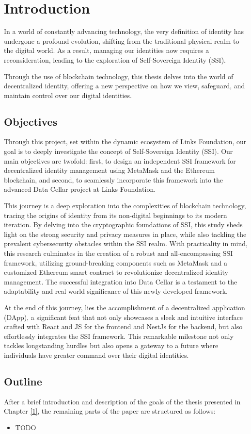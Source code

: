 \hypersetup{
    colorlinks=true,
    linkcolor=blue
}

\chapter{Introduction} \label{ch:introduction}

In a world of constantly advancing technology, the very definition of identity has undergone a 
profound evolution, shifting from the traditional physical realm to the digital world. As a 
result, managing our identities now requires a reconsideration, leading to the exploration of 
Self-Sovereign Identity (SSI). 

Through the use of blockchain technology, this thesis delves into the world of decentralized 
identity, offering a new perspective on how we view, safeguard, and maintain control over our 
digital identities.

\section{Objectives} 

Through this project, set within the dynamic ecosystem of Links Foundation, our goal is to deeply 
investigate the concept of Self-Sovereign Identity (SSI). Our main objectives are twofold: first, 
to design an independent SSI framework for decentralized identity management using MetaMask and 
the Ethereum blockchain, and second, to seamlessly incorporate this framework into the advanced 
Data Cellar project at Links Foundation.

This journey is a deep exploration into the complexities of blockchain technology, tracing the 
origins of identity from its non-digital beginnings to its modern iteration. By delving into the 
cryptographic foundations of SSI, this study sheds light on the strong security and privacy 
measures in place, while also tackling the prevalent cybersecurity obstacles within the SSI 
realm. With practicality in mind, this research culminates in the creation of a robust and 
all-encompassing SSI framework, utilizing ground-breaking components such as MetaMask and a 
customized Ethereum smart contract to revolutionize decentralized identity management. 
The successful integration into Data Cellar is a testament to the adaptability and real-world 
significance of this newly developed framework.

At the end of this journey, lies the accomplishment of a decentralized application (DApp), a 
significant feat that not only showcases a sleek and intuitive interface crafted with React and 
JS for the frontend and NestJs for the backend, but also effortlessly integrates the SSI 
framework. This remarkable milestone not only tackles longstanding hurdles but also opens a 
gateway to a future where individuals have greater command over their digital identities.

\section{Outline}

After a brief introduction and description of the goals of the thesis presented in Chapter 
\hyperref[ch:introduction]{[1]}, the remaining parts of the paper are structured as follows:

\begin{itemize}
    \item TODO
\end{itemize}


